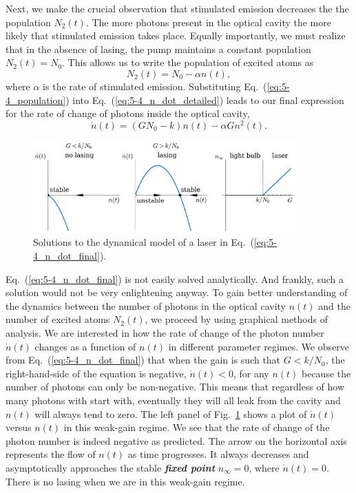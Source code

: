 Next, we make the crucial observation that stimulated emission decreases the the population $N_2(t)$.
The more photons present in the optical cavity the more likely that stimulated emission takes place.
Equally importantly, we must realize that in the absence of lasing, the pump maintains a constant population $N_2(t) = N_0$.
This allows us to write the population of excited atoms as
\begin{equation}
    N_2(t) = N_0 - \alpha n(t),
    \label{eq:5-4_population}
\end{equation}
where $\alpha$ is the rate of stimulated emission.
Substituting Eq.~(\ref{eq:5-4_population}) into Eq.~(\ref{eq:5-4_n_dot_detailed}) leads to our final expression for the rate of change of photons inside the optical cavity,
\begin{equation}
    \dot{n}(t) = (G N_0 - k) n(t) - \alpha G n^2(t).
    \label{eq:5-4_n_dot_final}
\end{equation}

\begin{figure}
    \centering
    \includegraphics[width=0.9\textwidth]{lesson5/5-4_lasing.pdf}
    \caption[Dynamical model of a laser]{Solutions to the dynamical model of a laser in Eq.~(\ref{eq:5-4_n_dot_final}).}
    \label{fig:5-4_lasing}
\end{figure}

Eq.~(\ref{eq:5-4_n_dot_final}) is not easily solved analytically.
And frankly, such a solution would not be very enlightening anyway.
To gain better understanding of the dynamics between the number of photons in the optical cavity $n(t)$ and the number of excited atoms $N_2(t)$, we proceed by using graphical methods of analysis.
We are interested in how the rate of change of the photon number $\dot{n}(t)$ changes as a function of $n(t)$ in different parameter regimes.
We observe from Eq.~(\ref{eq:5-4_n_dot_final}) that when the gain is such that $G < k / N_0$, the right-hand-side of the equation is negative, $\dot{n}(t) < 0$, for any $n(t)$ because the number of photons can only be non-negative.
This means that regardless of how many photons with start with, eventually they will all leak from the cavity and $n(t)$ will always tend to zero.
The left panel of Fig.~\ref{fig:5-4_lasing} shows a plot of $\dot{n}(t)$ versus $n(t)$ in this weak-gain regime.
We see that the rate of change of the photon number is indeed negative as predicted.
The arrow on the horizontal axis represents the flow of $n(t)$ as time progresses.
It always decreases and asymptotically approaches the stable \textit{\textbf{fixed point}} $n_{\infty} = 0$, where $\dot{n}(t) = 0$.
There is no lasing when we are in this weak-gain regime.


